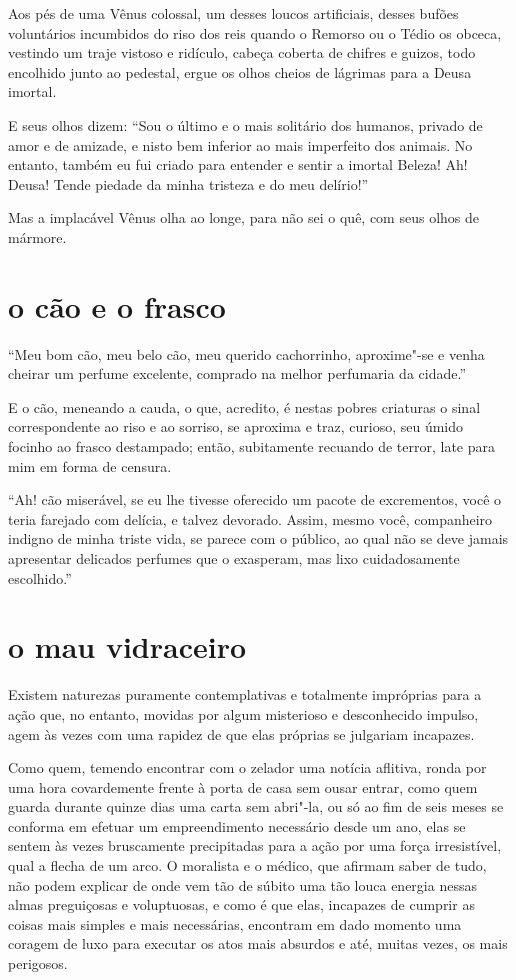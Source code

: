 Aos pés de uma Vênus colossal, um desses loucos artificiais, desses
bufões voluntários incumbidos do riso dos reis quando o Remorso ou o
Tédio os obceca, vestindo um traje vistoso e ridículo, cabeça
coberta de chifres e guizos, todo encolhido junto ao pedestal, ergue os
olhos cheios de lágrimas para a Deusa imortal.

E seus olhos dizem: ``Sou o último e o mais solitário dos
humanos, privado de amor e de amizade, e nisto bem inferior ao mais
imperfeito dos animais. No entanto, também eu fui criado para entender
e sentir a imortal Beleza! Ah! Deusa! Tende piedade da minha tristeza e
do meu delírio!''

Mas a implacável Vênus olha ao longe, para não sei o quê, com seus olhos
de mármore.

\quebra\section[O cão e o frasco]{o cão e o frasco}

``Meu bom cão, meu belo cão, meu querido cachorrinho,
aproxime"-se e venha cheirar um perfume excelente, comprado na melhor
perfumaria da cidade.''

E o cão, meneando a cauda, o que, acredito, é nestas pobres criaturas o
sinal correspondente ao riso e ao sorriso, se aproxima e traz,
curioso, seu úmido focinho ao frasco destampado; então, subitamente
recuando de terror, late para mim em forma de censura.

``Ah! cão miserável, se eu lhe tivesse oferecido um pacote
de excrementos, você o teria farejado com delícia, e talvez devorado.
Assim, mesmo você, companheiro indigno de minha triste vida, se parece
com o público, ao qual não se deve jamais apresentar delicados perfumes
que o exasperam, mas lixo cuidadosamente escolhido.''

\quebra\section[O mau vidraceiro]{o mau vidraceiro}

Existem naturezas puramente contemplativas e totalmente impróprias para
a ação que, no entanto, movidas por algum misterioso e desconhecido impulso,
agem às vezes com uma rapidez de que elas próprias se julgariam
incapazes.

Como quem, temendo encontrar com o zelador uma notícia aflitiva,
ronda por uma hora covardemente frente à porta de casa sem ousar
entrar, como quem guarda durante quinze dias uma carta sem
abri"-la, ou só ao fim de seis meses se conforma em efetuar um
empreendimento necessário desde um ano, elas se sentem às vezes
bruscamente precipitadas para a ação por uma força irresistível, qual a
flecha de um arco. O moralista e o médico, que afirmam saber de tudo,
não podem explicar de onde vem tão de súbito uma tão louca energia
nessas almas preguiçosas e voluptuosas, e como é que elas, incapazes de
cumprir as coisas mais simples e mais necessárias, encontram em dado
momento uma coragem de luxo para executar os atos mais absurdos e até,
muitas vezes, os mais perigosos.

